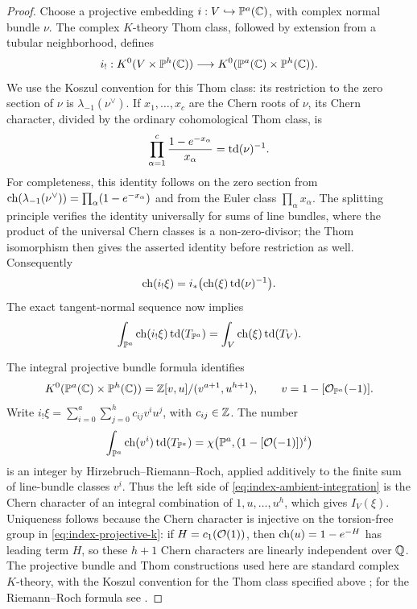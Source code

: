 \begin{proof}
Choose a projective embedding \(i:V\hookrightarrow\mathbb P^a(\mathbb C)\),
with complex normal bundle \(\nu\).
The complex \(K\)-theory Thom class, followed by extension from a
tubular neighborhood, defines
\[
 i_!:K^0(V\times\mathbb P^h(\mathbb C))
        \longrightarrow K^0(\mathbb P^a(\mathbb C)\times\mathbb P^h(\mathbb C)).
\]
We use the Koszul convention for this Thom class: its restriction
to the zero section of \(\nu\) is
\(\lambda_{-1}(\nu^\vee)\).
If \(x_1,\ldots,x_c\) are the Chern roots of \(\nu\), its Chern
character, divided by the ordinary cohomological Thom class, is
\[
 \prod_{\alpha=1}^c\frac{1-e^{-x_\alpha}}{x_\alpha}
       =\operatorname{td}(\nu)^{-1}.
\]
For completeness, this identity follows on the zero section from
\(\operatorname{ch}(\lambda_{-1}(\nu^\vee))=\prod_\alpha(1-e^{-x_\alpha})\)
and from the Euler class \(\prod_\alpha x_\alpha\).
The splitting principle verifies the identity universally for
sums of line bundles, where the product of the universal Chern
classes is a non-zero-divisor; the Thom isomorphism then gives
the asserted identity before restriction as well.
Consequently
\[
 \operatorname{ch}(i_!\xi)=i_*\bigl(\operatorname{ch}(\xi)\operatorname{td}(\nu)^{-1}\bigr).
\]
The exact tangent-normal sequence now implies
\begin{equation}\label{eq:index-ambient-integration}
 \int_{\mathbb P^a}\operatorname{ch}(i_!\xi)\operatorname{td}(T_{\mathbb P^a})
    =\int_V\operatorname{ch}(\xi)\operatorname{td}(T_V).
\end{equation}

The integral projective bundle formula identifies
\[
 K^0(\mathbb P^a(\mathbb C)\times\mathbb P^h(\mathbb C))
    =\mathbb Z[v,u]/(v^{a+1},u^{h+1}),\qquad
 v=1-[\mathcal O_{\mathbb P^a}(-1)].
\]
Write \(i_!\xi=\sum_{i=0}^a\sum_{j=0}^h c_{ij}v^iu^j\),
with \(c_{ij}\in\mathbb Z\).
The number
\[
 \int_{\mathbb P^a}\operatorname{ch}(v^i)\operatorname{td}(T_{\mathbb P^a})
    =\chi\bigl(\mathbb P^a,(1-[\mathcal O(-1)])^i\bigr)
\]
is an integer by Hirzebruch--Riemann--Roch, applied additively to
the finite sum of line-bundle classes \(v^i\).
Thus the left side of \eqref{eq:index-ambient-integration} is the
Chern character of an integral combination of \(1,u,\ldots,u^h\),
which gives \(I_V(\xi)\).
Uniqueness follows because the Chern character is injective on
the torsion-free group in \eqref{eq:index-projective-k}:
if \(H=c_1(\mathcal O(1))\), then \(\operatorname{ch}(u)=1-e^{-H}\) has leading term \(H\),
so these \(h+1\) Chern characters are linearly independent over \(\mathbb Q\).
The projective bundle and Thom constructions used here are standard
complex \(K\)-theory, with the Koszul convention for the Thom class
specified above \cite[Proposition~2.24, Theorem~2.25,
and pp.~113--114]{Hatcher}; for the
Riemann--Roch formula see \cite[\S7]{BorelSerre58}.
\end{proof}


